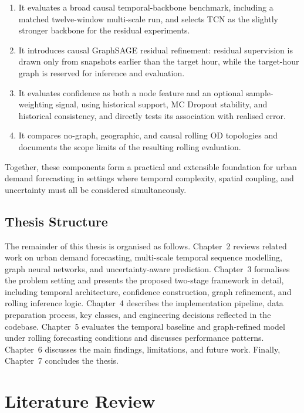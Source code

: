 \documentclass[12pt,a4paper]{report}
\begin{document}
\begin{enumerate}
	\item It evaluates a broad causal temporal-backbone benchmark, including a matched twelve-window multi-scale run, and selects TCN as the slightly stronger backbone for the residual experiments.
	
	\item It introduces causal GraphSAGE residual refinement: residual supervision is drawn only from snapshots earlier than the target hour, while the target-hour graph is reserved for inference and evaluation.
	
	\item It evaluates confidence as both a node feature and an optional sample-weighting signal, using historical support, MC Dropout stability, and historical consistency, and directly tests its association with realised error.
	
	\item It compares no-graph, geographic, and causal rolling OD topologies and documents the scope limits of the resulting rolling evaluation.
\end{enumerate}

Together, these components form a practical and extensible foundation for urban demand forecasting in settings where temporal complexity, spatial coupling, and uncertainty must all be considered simultaneously.

\section{Thesis Structure}

The remainder of this thesis is organised as follows. Chapter~2 reviews related work on urban demand forecasting, multi-scale temporal sequence modelling, graph neural networks, and uncertainty-aware prediction. Chapter~3 formalises the problem setting and presents the proposed two-stage framework in detail, including temporal architecture, confidence construction, graph refinement, and rolling inference logic. Chapter~4 describes the implementation pipeline, data preparation process, key classes, and engineering decisions reflected in the codebase. Chapter~5 evaluates the temporal baseline and graph-refined model under rolling forecasting conditions and discusses performance patterns. Chapter~6 discusses the main findings, limitations, and future work. Finally, Chapter~7 concludes the thesis.
	
	\chapter{Literature Review}
\end{document}
